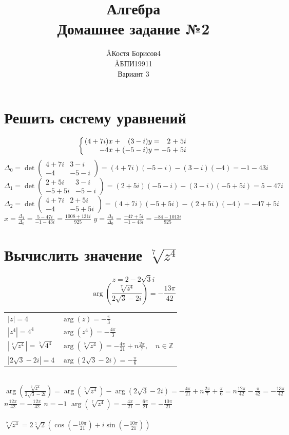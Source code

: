 \documentclass{article}
\title{Алгебра \\ Домашнее задание №2}
\author{\AA{Костя Борисов}{4} \\ \AA{БПИ199}{11} \\ Вариант 3}
\newcommand{\ds}{\displaystyle}
\newcommand{\abs}[1]{\left|#1\right|}
\newcommand{\Arg}[1]{\arg\left(#1\right)}
\newcommand{\TrigFrom}[1]{
  \left(\cos\left({#1}\right)+i\sin\left({#1}\right)\right)
}
\begin{document}
  \maketitle

  \section{Решить систему уравнений}
  \[
    \left\{
      \arraycolsep=1.4pt
      \begin{array}{rrrrrrr}
        (4+7i)x &+& (3-i)y &=& 2&+&5i \\
        -4x &+& (-5-i)y &=& -5&+&5i
      \end{array}
    \right.
  \]
  $\ds \Delta_0 = \det\begin{pmatrix}
    4+7i & 3-i \\
    -4 & -5-i
  \end{pmatrix} = (4+7i)(-5-i)-(3-i)(-4) = -1-43i$
  \\
  $\ds \Delta_1 = \det\begin{pmatrix}
    2+5i & 3-i \\
    -5+5i & -5-i
  \end{pmatrix} = (2+5i)(-5-i)-(3-i)(-5+5i) = 5-47i$
  \\
  $\ds \Delta_2 = \det\begin{pmatrix}
    4+7i & 2+5i \\
    -4 & -5+5i
  \end{pmatrix} = (4+7i)(-5+5i)-(2+5i)(-4) = -47+5i$
  \\
  $\ds x = \frac{\Delta_1}{\Delta_0} = \frac{5-47i}{-1-43i} = \frac{1008 + 131i}{925}$ \quad
  $\ds y = \frac{\Delta_2}{\Delta_0} = \frac{-47+5i}{-1-43i} = \frac{-84 - 1013i}{925}$

  \section{Вычислить значение $\sqrt[7]{z^4}$}
  $$ z = 2 - 2\sqrt{3}i $$
  $$ \Arg{ \frac{\sqrt[7]{z^4}}{2\sqrt{3} - 2i} } = -\frac{13\pi}{42} $$
  \begin{tabular}{ll}
    $\ds \abs{z} = 4$ & $\ds \Arg z = -\frac{\pi}{3}$ \\
    $\ds \abs{z^4} = 4^4$ & $\ds \Arg{z^4} = -\frac{4\pi}{3}$ \\
    $\ds \abs{\sqrt[7]{z^4}} = \sqrt[7]{4^4}$ & $\ds \Arg{\sqrt[7]{z^4}} = -\frac{4\pi}{21} + n\frac{2\pi}{7},\quad n\in\mathbb{Z}$ \\
    $\ds \abs{2\sqrt{3} - 2i} = 4$ & $\ds \Arg{2\sqrt{3} - 2i} = -\frac{\pi}{6}$
  \end{tabular} \\
  $\ds \Arg{ \frac{\sqrt[7]{z^4}}{2\sqrt{3} - 2i} }
    = \Arg{\sqrt[7]{z^4}} - \Arg{2\sqrt{3} - 2i}
    = -\frac{4\pi}{21} + n\frac{2\pi}{7} + \frac{\pi}{6}
    = n\frac{12\pi}{42} - \frac{\pi}{42}
    = -\frac{13\pi}{42}
  $ \\
  $\ds n\frac{12\pi}{42} = -\frac{12\pi}{42}$ \quad $n = -1$ \quad
  $\ds \Arg{\sqrt[7]{z^4}} = -\frac{4\pi}{21} - \frac{6\pi}{21} = -\frac{10\pi}{21}$ \\ \\
  $\ds \sqrt[7]{z^4} = 2\sqrt[7]{2} \TrigFrom{-\frac{10\pi}{21}}$
\end{document}
